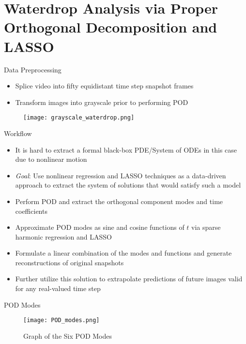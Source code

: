 \documentclass[aspectratio=169,xcolor=dvipsnames]{beamer}
\begin{document}
\section{Waterdrop Analysis via Proper Orthogonal Decomposition and LASSO}

\begin{frame}{Data Preprocessing}
    \begin{itemize}
        \item Splice video into fifty equidistant time step snapshot frames
        \item Transform images into grayscale prior to performing POD
    \end{itemize}
    \begin{figure}
        \centering
        \texttt{[image: grayscale\_waterdrop.png]}
        \label{fig:grayscale_water}
    \end{figure}
\end{frame}

\begin{frame}{Workflow}
\begin{itemize}
    \item It is hard to extract a formal black-box PDE/System of ODEs in this case due to nonlinear motion
    \item \emph{Goal}: Use nonlinear regression and LASSO techniques as a data-driven approach to extract the system of solutions that would satisfy such a model
    \item Perform POD and extract the orthogonal component modes and time coefficients
    \item Approximate POD modes as sine and cosine functions of $t$ via sparse harmonic regression and LASSO
    \item Formulate a linear combination of the modes and functions and generate reconstructions of original snapshots
    \item Further utilize this solution to extrapolate predictions of future images valid for any real-valued time step
\end{itemize}
\end{frame}

\begin{frame}{POD Modes}
    \begin{figure}
        \centering
        \texttt{[image: POD\_modes.png]}
        \caption{Graph of the Six POD Modes}
    \end{figure}
\end{frame}
\end{document}
